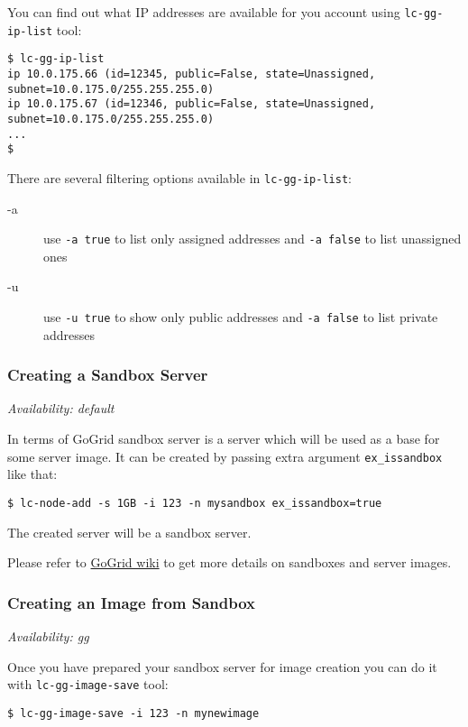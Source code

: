 \documentclass[a4paper]{report}
\begin{document}
You can find out what IP addresses are available for you account using 
\texttt{lc-gg-ip-list} tool:

\begin{verbatim}
$ lc-gg-ip-list
ip 10.0.175.66 (id=12345, public=False, state=Unassigned, subnet=10.0.175.0/255.255.255.0)
ip 10.0.175.67 (id=12346, public=False, state=Unassigned, subnet=10.0.175.0/255.255.255.0)
...
$
\end{verbatim}

There are several filtering options available in \texttt{lc-gg-ip-list}:

\begin{description}
  \item[-a] use \texttt{-a true} to list only assigned addresses and
       \texttt{-a false} to list unassigned ones
  \item[-u] use \texttt{-u true} to show only public addresses and
       \texttt{-a false} to list private addresses
\end{description}

\subsubsection{Creating a Sandbox Server}

\textit{Availability: default}

In terms of GoGrid sandbox server is a server which will be used as a base for
some server image. It can be created by passing extra argument {\tt ex\_issandbox}
like that:

\begin{verbatim}
$ lc-node-add -s 1GB -i 123 -n mysandbox ex_issandbox=true
\end{verbatim}


The created server will be a sandbox server.


Please refer to \href{http://wiki.gogrid.com/wiki/index.php/MyGSI}{GoGrid wiki} to get
more details on sandboxes and server images.

\subsubsection{Creating an Image from Sandbox}

\textit{Availability: gg}

Once you have prepared your sandbox server for image creation you can do it with
\texttt{lc-gg-image-save} tool:

\begin{verbatim}
$ lc-gg-image-save -i 123 -n mynewimage
\end{verbatim}
\end{document}
